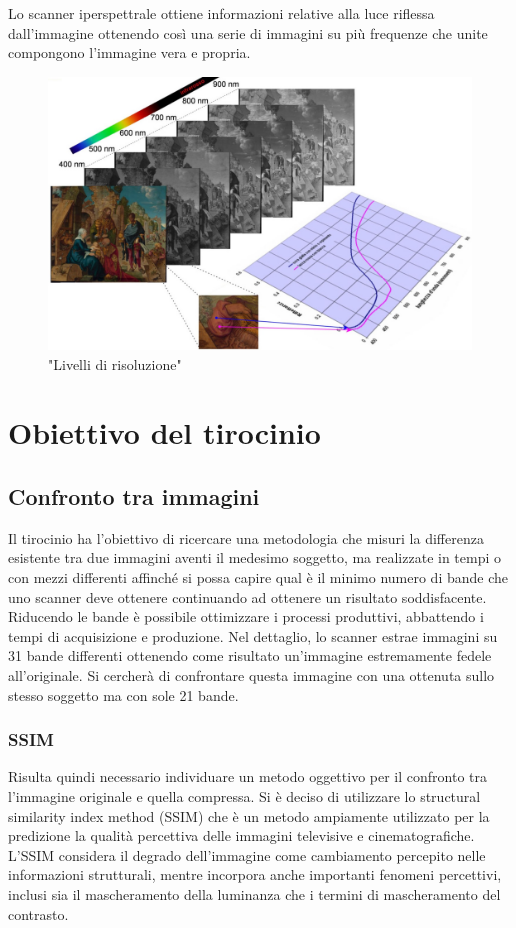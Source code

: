 \documentclass[a4paper,11pt]{article}
\begin{document}
        Lo scanner iperspettrale ottiene informazioni relative alla luce riflessa dall'immagine ottenendo così una serie di immagini su più frequenze che unite compongono l'immagine vera e propria.

        \begin{figure}[h]
            \centering
            \includegraphics[scale=0.4]{colorimetria4}
            \caption{"Livelli di risoluzione"}
        \end{figure}

    \newpage
    \section {Obiettivo del tirocinio}
    \subsection{Confronto tra immagini}
    Il tirocinio ha l’obiettivo di ricercare una metodologia che misuri la differenza esistente tra due immagini aventi il medesimo soggetto, ma realizzate in tempi o con mezzi differenti affinché si possa 
    capire qual è il minimo numero di bande che uno scanner deve ottenere continuando ad ottenere un risultato soddisfacente.
    Riducendo le bande è possibile ottimizzare i processi produttivi, abbattendo i tempi di acquisizione e produzione.
    Nel dettaglio, lo scanner estrae immagini su 31 bande differenti ottenendo come risultato un'immagine estremamente fedele all'originale. Si cercherà di confrontare questa immagine con una ottenuta sullo stesso soggetto ma con sole 21 bande. 
    \subsubsection{SSIM}
    Risulta quindi necessario individuare un metodo oggettivo per il confronto tra l'immagine originale e quella compressa. 
    Si è deciso di utilizzare lo structural similarity index method (SSIM) che è un metodo ampiamente utilizzato per la predizione la qualità percettiva delle immagini televisive e cinematografiche.
    L'SSIM considera il degrado dell'immagine come cambiamento percepito nelle informazioni strutturali, mentre incorpora anche importanti fenomeni percettivi, inclusi sia il mascheramento della luminanza che i termini di mascheramento del contrasto. 
\end{document}

